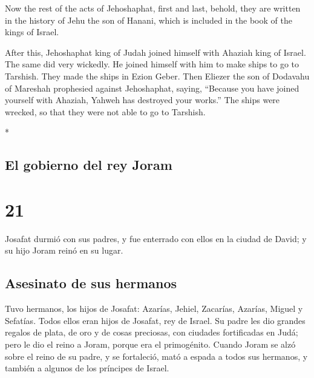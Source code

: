 \begin{paracol}{2}
\begin{otherlanguage}{english}
 Now the rest of the acts of Jehoshaphat, first and last,
behold, they are written in the history of Jehu the son of Hanani, which
is included in the book of the kings of Israel.

 After this, Jehoshaphat king of Judah joined himself
with Ahaziah king of Israel. The same did very wickedly. 
He joined himself with him to make ships to go to Tarshish. They made
the ships in Ezion Geber.  Then Eliezer the son of
Dodavahu of Mareshah prophesied against Jehoshaphat, saying, ``Because
you have joined yourself with Ahaziah, Yahweh has destroyed your
works.'' The ships were wrecked, so that they were not able to go to
Tarshish.

\end{otherlanguage}

\switchcolumn[0]*

\hypertarget{el-gobierno-del-rey-joram}{%
\subsection{El gobierno del rey Joram}\label{el-gobierno-del-rey-joram}}

\hypertarget{section-40}{%
\section{21}\label{section-40}}

 Josafat durmió con sus padres, y fue enterrado con ellos
en la ciudad de David; y su hijo Joram reinó en su lugar.

\hypertarget{asesinato-de-sus-hermanos}{%
\subsection{Asesinato de sus hermanos}\label{asesinato-de-sus-hermanos}}

 Tuvo hermanos, los hijos de Josafat: Azarías, Jehiel,
Zacarías, Azarías, Miguel y Sefatías. Todos ellos eran hijos de Josafat,
rey de Israel.  Su padre les dio grandes regalos de plata,
de oro y de cosas preciosas, con ciudades fortificadas en Judá; pero le
dio el reino a Joram, porque era el primogénito.  Cuando
Joram se alzó sobre el reino de su padre, y se fortaleció, mató a espada
a todos sus hermanos, y también a algunos de los príncipes de Israel.

\hypertarget{la-posiciuxf3n-de-dios-sobre-la-apostasuxeda-de-joram}{%
}
\end{paracol}
